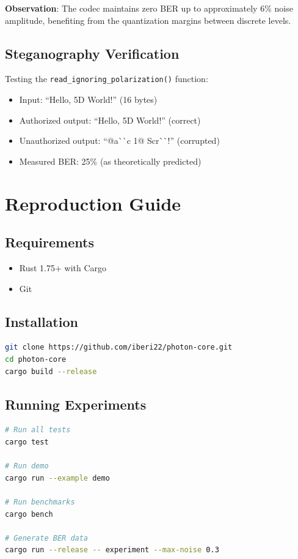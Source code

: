 \documentclass[11pt,a4paper]{article}
\begin{document}
\textbf{Observation}: The codec maintains zero BER up to approximately 6\% noise amplitude, benefiting from the quantization margins between discrete levels.

\subsection{Steganography Verification}

Testing the \texttt{read\_ignoring\_polarization()} function:

\begin{itemize}
    \item Input: ``Hello, 5D World!'' (16 bytes)
    \item Authorized output: ``Hello, 5D World!'' (correct)
    \item Unauthorized output: ``@a\`{}\`{}c  1@ Scr\`{}\`{}!'' (corrupted)
    \item Measured BER: 25\% (as theoretically predicted)
\end{itemize}

\section{Reproduction Guide}

\subsection{Requirements}
\begin{itemize}
    \item Rust 1.75+ with Cargo
    \item Git
\end{itemize}

\subsection{Installation}
\begin{lstlisting}[language=bash]
git clone https://github.com/iberi22/photon-core.git
cd photon-core
cargo build --release
\end{lstlisting}

\subsection{Running Experiments}
\begin{lstlisting}[language=bash]
# Run all tests
cargo test

# Run demo
cargo run --example demo

# Run benchmarks
cargo bench

# Generate BER data
cargo run --release -- experiment --max-noise 0.3
\end{lstlisting}
\end{document}
